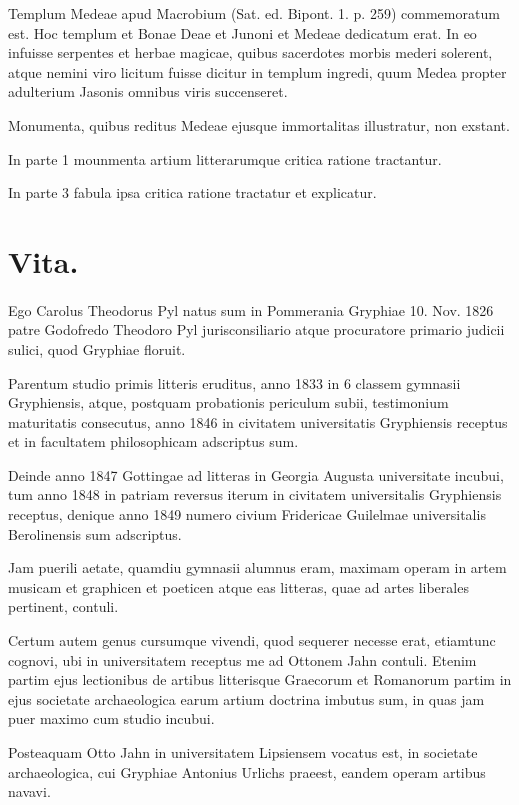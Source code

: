 \documentclass[landscape, a4paper, 11pt, oneside, polutonikogreek, german]{article}
\begin{document}
Templum Medeae apud Macrobium (Sat. ed. Bipont. 1. p. 259) commemoratum est. Hoc templum et Bonae Deae et Junoni et Medeae dedicatum erat. In eo infuisse serpentes et herbae magicae, quibus sacerdotes morbis mederi solerent, atque nemini viro licitum fuisse dicitur in templum ingredi, quum Medea propter adulterium Jasonis omnibus viris succenseret.

Monumenta, quibus reditus Medeae ejusque immortalitas illustratur, non exstant.

In parte 1 mounmenta artium litterarumque critica ratione tractantur.

In parte 3 fabula ipsa critica ratione tractatur et explicatur.
\clearpage
\section{Vita.}
\paragraph{}
Ego Carolus Theodorus Pyl natus sum in Pommerania Gryphiae 10. Nov. 1826 patre Godofredo Theodoro Pyl jurisconsiliario atque procuratore primario judicii sulici, quod Gryphiae floruit.

Parentum studio primis litteris eruditus, anno 1833 in 6 classem gymnasii Gryphiensis, atque, postquam probationis periculum subii, testimonium maturitatis consecutus, anno 1846 in civitatem universitatis Gryphiensis receptus et in facultatem philosophicam adscriptus sum.

Deinde anno 1847 Gottingae ad litteras in Georgia Augusta universitate incubui, tum anno 1848 in patriam reversus iterum in civitatem universitalis Gryphiensis receptus, denique anno 1849 numero civium Fridericae Guilelmae universitalis Berolinensis sum adscriptus.

Jam puerili aetate, quamdiu gymnasii alumnus eram, maximam operam in artem musicam et graphicen et poeticen atque eas litteras, quae ad artes liberales pertinent, contuli.

Certum autem genus cursumque vivendi, quod sequerer necesse erat, etiamtunc cognovi, ubi in universitatem receptus me ad Ottonem Jahn contuli. Etenim partim ejus lectionibus de artibus litterisque Graecorum et Romanorum partim in ejus societate archaeologica earum artium doctrina imbutus sum, in quas jam puer maximo cum studio incubui.

Posteaquam Otto Jahn in universitatem Lipsiensem vocatus est, in societate archaeologica, cui Gryphiae Antonius Urlichs praeest, eandem operam artibus navavi.
\end{document}

